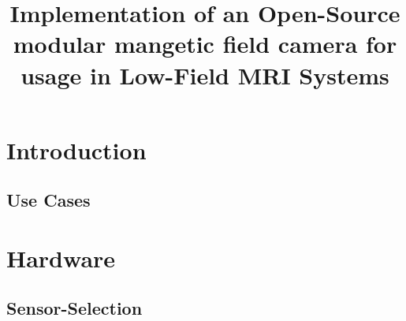 \documentclass[conference]{IEEEtran}
\begin{document}
\title{Implementation of an Open-Source modular mangetic field camera for usage in Low-Field MRI Systems\\

}


\author{
}

\maketitle

\begin{abstract}

\end{abstract}

\begin{IEEEkeywords}
\end{IEEEkeywords}



\section{Introduction}


\subsection{Use Cases}




\section{Hardware}



\subsection{Sensor-Selection}
\end{document}

